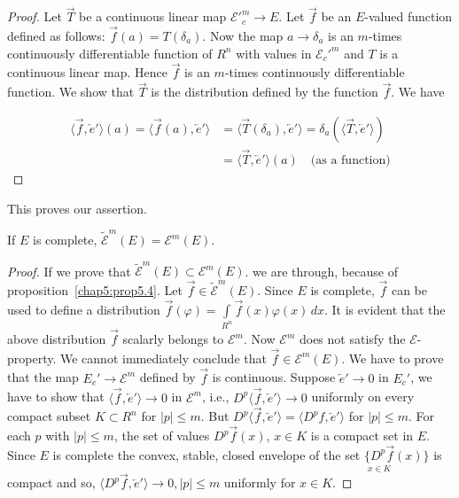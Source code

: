 \begin{proof}
Let $\overrightarrow{T}$ be a continuous linear map $\mathscr{E'}_c^m
\to E$. Let $\overrightarrow{f}$ be an $E$-valued function defined as
follows: $\overrightarrow{f} (a) = T (\delta_a)$. Now\pageoriginale
the map $a \to \delta_a$ is an $m$-times continuously differentiable
function of $R^n$ with values in $\mathscr{E}_c'^m$ and $T$ is a
continuous linear map. Hence $\overrightarrow{f}$ is an $m$-times
continuously differentiable function. We show that
$\overrightarrow{T}$ is the distribution defined by the function
$\overrightarrow{f}$. We have

\begin{align*}
\langle \overrightarrow{f}, \overleftarrow{e}'\rangle (a) = \langle
\overrightarrow{f} (a), \overleftarrow{e}'\rangle &= \langle
\overrightarrow{T} (\delta_a), \overleftarrow{e}'\rangle = \delta_a
(\langle \overrightarrow{T}, \overleftarrow{e}'\rangle )\\
&= \langle \overrightarrow{T}, \overleftarrow{e}'\rangle (a)\quad \text{(as
  a function)}
\end{align*}
\end{proof}
This proves our assertion.

\begin{prop}\label{chap5:prop5.5}
If $E$ is complete, $\tilde{\mathscr{E}}^m(E)=\mathscr{E}^m(E)$. 
\end{prop}

\begin{proof}
If we prove that $\tilde{\mathscr{E}}^m(E) \subset
\mathscr{E}^m(E)$. we are through, because of proposition~\ref{chap5:prop5.4}.
Let $\overrightarrow{f} \in \tilde{\mathscr{E}}^m(E)$. Since $E$ is
complete, $\overrightarrow{f}$ can be used to define a distribution
$\overrightarrow{f} (\varphi)=\int\limits_{R^n} \overrightarrow{f}(x)
\varphi (x)\,dx$. It is evident that the above distribution
$\overrightarrow{f}$ scalarly belongs to $\mathscr{E}^m$. Now
$\mathscr{E}^m$ does not satisfy the $\mathcal{E}$-property. We cannot
immediately conclude that $\overrightarrow{f} \in
\mathscr{E}^m(E)$. We have to prove that the map $E_c' \to
\mathscr{E}^m$ defined by $\overrightarrow{f}$ is continuous. Suppose
$\overleftarrow{e}' \to 0$ in $E_c'$, we have to show that $\langle
\overrightarrow{f}, \overleftarrow{e}'\rangle \to 0$ in
$\mathscr{E}^m$, i.e., $D^p\langle \overrightarrow{f},
\overleftarrow{e}'\rangle \to 0$ uniformly on every compact subset
$K\subset R^n$ for $|p|\leq m$. But $D^p\langle \overrightarrow{f},
\overleftarrow{e}'\rangle=\langle D^p f, \overleftarrow{e}'\rangle$
for $|p|\leq m$. For each $p$ with $|p|\leq m$, the set of values $D^p
\overrightarrow{f}(x)$, $x \in K$ is a compact set in $E$. Since $E$
is complete the convex, stable, closed envelope of the set
$\underset{x \in K}{\{D^p \overrightarrow{f}}(x)\}$ is compact
and so, $\langle D^p \overrightarrow{f},\overleftarrow{e}' \rangle \to 0,
|p|\leq m$ uniformly for $ x \in K$.
\end{proof}

